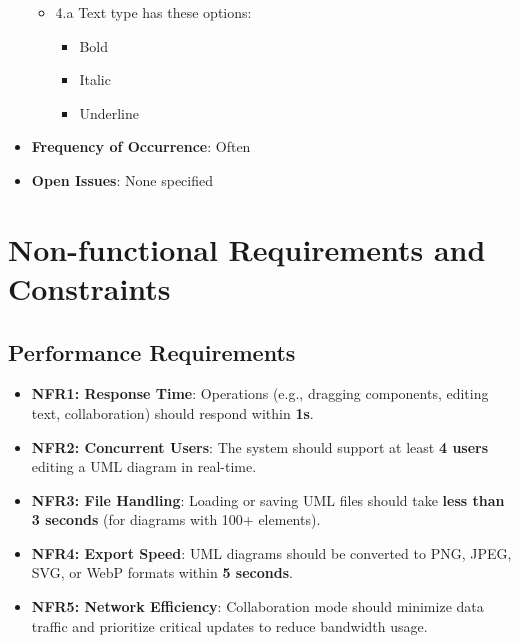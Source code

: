 \documentclass[12pt]{article}
\begin{document}
\begin{itemize}
\begin{itemize}
            \item 4.a Text type has these options:
            \begin{itemize}
                \item Bold
                \item Italic
                \item Underline
            \end{itemize}
        \end{itemize}
        \item \textbf{Frequency of Occurrence}: Often
        \item \textbf{Open Issues}: None specified
    \end{itemize}






    \section{Non-functional Requirements and Constraints}

    \subsection{Performance Requirements}
    \begin{itemize}
        \item \textbf{NFR1: Response Time}: Operations (e.g., dragging components, editing text, collaboration) should respond within \textbf{1s}.
        \item \textbf{NFR2: Concurrent Users}: The system should support at least \textbf{4 users} editing a UML diagram in real-time.
        \item \textbf{NFR3: File Handling}: Loading or saving UML files should take \textbf{less than 3 seconds} (for diagrams with 100+ elements).
        \item \textbf{NFR4: Export Speed}: UML diagrams should be converted to PNG, JPEG, SVG, or WebP formats within \textbf{5 seconds}.
        \item \textbf{NFR5: Network Efficiency}: Collaboration mode should minimize data traffic and prioritize critical updates to reduce bandwidth usage.
    \end{itemize}
\end{document}
